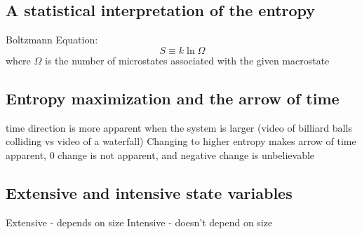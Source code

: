 \documentclass{article}
\begin{document}
\subsection{A statistical interpretation of the entropy}
\begin{outline}
\1 Boltzmann Equation: \[S\equiv k\ln\Omega\] where $\Omega$ is the number of microstates associated with the given macrostate
\end{outline}
\subsection{Entropy maximization and the arrow of time}
\begin{outline}
\1 time direction is more apparent when the system is larger (video of billiard balls colliding vs video of a waterfall)
\1 Changing to higher entropy makes arrow of time apparent, 0 change is not apparent, and negative change is unbelievable
\end{outline}
\subsection{Extensive and intensive state variables}
\begin{outline}
\1 Extensive - depends on size
\1 Intensive - doesn't depend on size
\end{outline}
\end{document}
